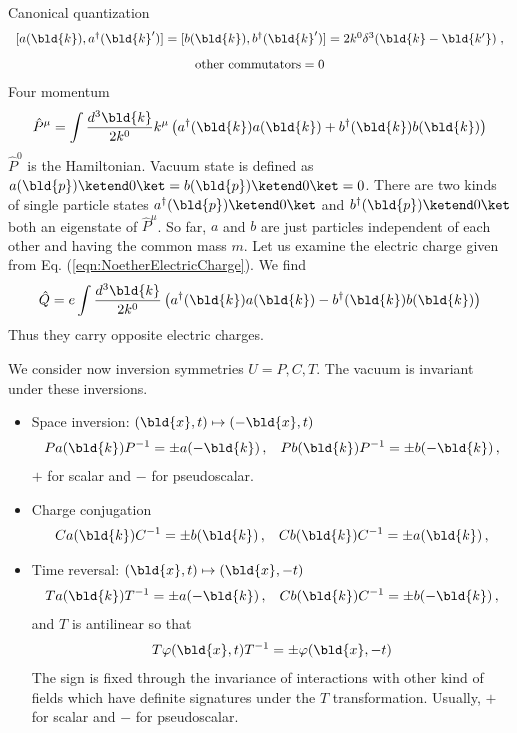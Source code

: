 Canonical quantization
\begin{equation}
\begin{array}{c}
[ a(\bld{k}), a^\dagger(\bld{k}')] = 
[ b(\bld{k}), b^\dagger(\bld{k}')] = 
2k^0\delta^3 (\bld{k} - \bld{k'} )\;,
\vspace{3mm}
\\
\mbox{other commutators} = 0
\label{eqn:complscalarcancomm}
\end{array}
\end{equation}
Four momentum
\begin{equation}
\hat{P}^\mu = \int \frac{d^3 \bld{k}}{2k^0} k^\mu \left(
a^\dagger(\bld{k}) a(\bld{k}) + b^\dagger(\bld{k}) b(\bld{k})
\right)
\label{eqn:KGcomplex_FourMomentum}
\end{equation}
$\hat{P}^0$ is the Hamiltonian.
Vacuum state is defined as $a(\bld{p}) \ketend 0 \ket = b(\bld{p}) \ketend 0 \ket =0$.
There are two kinds of single particle states $a^\dagger(\bld{p}) \ketend 0 \ket$ and
$b^\dagger(\bld{p}) \ketend 0 \ket$ both an eigenstate of $\hat{P}^\mu$.
So far, $a$ and $b$ are just particles independent of each other and having
the common mass $m$. Let us examine the electric charge given from
Eq. (\ref{eqn:NoetherElectricCharge}). We find
\begin{equation}
\hat{Q} = e \int \frac{d^3 \bld{k}}{2k^0}  \left(
a^\dagger(\bld{k}) a(\bld{k}) - b^\dagger(\bld{k}) b(\bld{k})
\right)
\label{eqn:KGcomplex_Charge}
\end{equation}
Thus they carry opposite electric charges.

We consider now inversion symmetries $U = P, C, T$. 
The vacuum is invariant under these inversions.
\begin{itemize}
\item
Space inversion:
$(\bld{x}, t) \mapsto (-\bld{x}, t)$ 
\begin{eqnarray}
P a(\bld{k}) P^{-1} = \pm a(-\bld{k})\,,
\hspace{3mm}
P b(\bld{k}) P^{-1} = \pm b(-\bld{k})\,,
\end{eqnarray}
$+$ for scalar and $-$ for pseudoscalar.
\item
Charge conjugation
\begin{eqnarray}
C a(\bld{k}) C^{-1} = \pm b(\bld{k})\,,
\hspace{3mm}
C b(\bld{k}) C^{-1} = \pm a(\bld{k})\,,
\end{eqnarray}
\item
Time reversal: $(\bld{x}, t) \mapsto (\bld{x}, -t)$ 
\begin{eqnarray}
T a(\bld{k}) T^{-1} = \pm a(-\bld{k})\,,
\hspace{3mm}
C b(\bld{k}) C^{-1} = \pm b(-\bld{k})\,,
\end{eqnarray}
and $T$ is antilinear so that
\begin{eqnarray}
T \varphi(\bld{x}, t) T^{-1} = \pm \varphi(\bld{x}, -t)
\end{eqnarray}
The sign is fixed through the invariance of interactions 
with other kind of fields which have definite signatures
under the $T$ transformation. Usually, $+$ for scalar and
$-$ for pseudoscalar.
\end{itemize}

